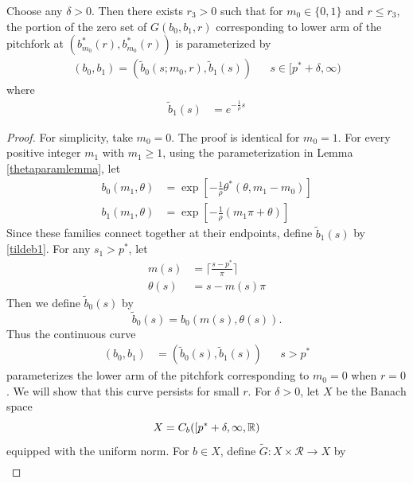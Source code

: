 \documentclass[thesis.tex]{subfiles}
\begin{document}
\begin{lemma}\label{armpersists}
Choose any $\delta > 0$. Then there exists $r_3 > 0$ such that for $m_0 \in \{0, 1\}$ and $r \leq r_3$, the portion of the zero set of $G(b_0, b_1, r)$ corresponding to lower arm of the pitchfork at $(b_{m_0}^*(r), b_{m_0}^*(r))$ is parameterized by
\begin{align*}
(b_0, b_1) = (\tilde{b}_0(s; m_0, r), \tilde{b}_1(s)) && s \in [p^* + \delta, \infty)
\end{align*}
where
\begin{align}\label{tildeb1}
\tilde{b}_1(s) &= e^{-\frac{1}{\rho}s} 
\end{align}

\begin{proof}
For simplicity, take $m_0 = 0$. The proof is identical for $m_0 = 1$. For every positive integer $m_1$ with $m_1 \geq 1$, using the parameterization in Lemma \ref{thetaparamlemma}, let
\begin{equation}\label{thetaparam}
\begin{aligned}
b_0( m_1, \theta) &= \exp\left[ -\frac{1}{\rho}\theta^*(\theta, m_1 - m_0) \right] \\
b_1( m_1, \theta) &= \exp\left[ -\frac{1}{\rho}(m_1 \pi + \theta) \right]
\end{aligned}
\end{equation}
Since these families connect together at their endpoints, define $\tilde{b}_1(s)$ by \cref{tildeb1}. For any $s_1 > p^*$, let
\begin{equation}
\begin{aligned}
m(s) &= \lceil \frac{s - p^*}{\pi} \rceil \\
\theta(s) &= s - m(s) \pi
\end{aligned}
\end{equation}
Then we define $\tilde{b}_0(s)$ by
\begin{equation}\label{tildeb0}
\tilde{b}_0(s) = b_0(m(s), \theta(s)).
\end{equation}
Thus the continuous curve 
\begin{align*}
(b_0, b_1) &= (\tilde{b}_0(s), \tilde{b}_1(s)) && s > p^*
\end{align*}
parameterizes the lower arm of the pitchfork corresponding to $m_0 = 0$ when $r = 0$. We will show that this curve persists for small $r$. For $\delta > 0$, let $X$ be the Banach space
\[
X = C_b([p^* + \delta, \infty, \mathbb{R})
\]
equipped with the uniform norm. For $b \in X$, define $\tilde{G}: X \times \mathcal{R} \rightarrow X$ by
\begin{align*}

\end{align*}
\end{proof}
\end{lemma}
\end{document}
